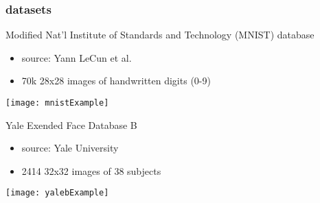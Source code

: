 \iffalse
\begin{frame}
\frametitle{motivation}
	
	\begin{itemize}
		\item classifiers are a foundation of data science
		\item applications: general classification, subspace analysis
	\end{itemize}

\end{frame}
\fi

\begin{frame}
\frametitle{datasets}
	
Modified Nat'l Institute of Standards and Technology (MNIST) database
	\begin{itemize}
		\setlength{\itemindent}{4em}
		\item source: Yann LeCun et al. \cite{lecun-mnisthandwrittendigit-2010}
		\item 70k 28x28 images of handwritten digits (0-9)
	\end{itemize}

	{
          \begin{center}
	  \texttt{[image: mnistExample]}
          \end{center}
	}

Yale Exended Face Database B
	\begin{itemize}
		\setlength{\itemindent}{4em}
		\item source: Yale University \cite{yaleB}
		\item 2414 32x32 images of 38 subjects
	\end{itemize}

	{
          \begin{center}
	  \texttt{[image: yalebExample]}
          \end{center}
	}

\end{frame}